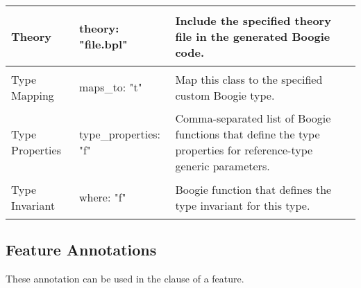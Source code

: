 \begin{longtable}{|m{2.5cm}|l|m{6.05cm}|}
Theory &
{\begin{erunning}
theory: "file.bpl"
\end{erunning}} &
Include the specified theory file in the generated Boogie code.
\\ \hline

Type \newline Mapping &
{\begin{erunning}
maps_to: "t"
\end{erunning}} &
Map this class to the specified custom Boogie type.
\\ \hline

Type \newline Properties &
{\begin{erunning}
type_properties: "f"
\end{erunning}} &
Comma-separated list of Boogie functions that define the type properties for reference-type generic parameters.
\\ \hline

Type \newline Invariant &
{\begin{erunning}
where: "f"
\end{erunning}} &
Boogie function that defines the type invariant for this type.
\\ \hline

\end{longtable}
  

\subsection{Feature Annotations}

These annotation can be used in the  clause of a feature.

